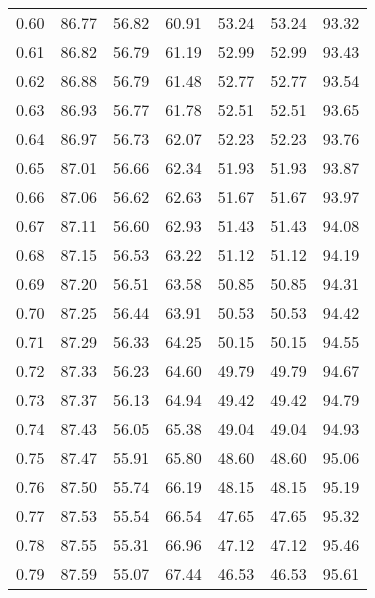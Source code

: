 \begin{tabular}{|c|c|c|c|c|c|c|}
      0.60 &     86.77 &     56.82 &      60.91 &   53.24 &      53.24 &         93.32 \\
      0.61 &     86.82 &     56.79 &      61.19 &   52.99 &      52.99 &         93.43 \\
      0.62 &     86.88 &     56.79 &      61.48 &   52.77 &      52.77 &         93.54 \\
      0.63 &     86.93 &     56.77 &      61.78 &   52.51 &      52.51 &         93.65 \\
      0.64 &     86.97 &     56.73 &      62.07 &   52.23 &      52.23 &         93.76 \\
      0.65 &     87.01 &     56.66 &      62.34 &   51.93 &      51.93 &         93.87 \\
      0.66 &     87.06 &     56.62 &      62.63 &   51.67 &      51.67 &         93.97 \\
      0.67 &     87.11 &     56.60 &      62.93 &   51.43 &      51.43 &         94.08 \\
      0.68 &     87.15 &     56.53 &      63.22 &   51.12 &      51.12 &         94.19 \\
      0.69 &     87.20 &     56.51 &      63.58 &   50.85 &      50.85 &         94.31 \\
      0.70 &     87.25 &     56.44 &      63.91 &   50.53 &      50.53 &         94.42 \\
      0.71 &     87.29 &     56.33 &      64.25 &   50.15 &      50.15 &         94.55 \\
      0.72 &     87.33 &     56.23 &      64.60 &   49.79 &      49.79 &         94.67 \\
      0.73 &     87.37 &     56.13 &      64.94 &   49.42 &      49.42 &         94.79 \\
      0.74 &     87.43 &     56.05 &      65.38 &   49.04 &      49.04 &         94.93 \\
      0.75 &     87.47 &     55.91 &      65.80 &   48.60 &      48.60 &         95.06 \\
      0.76 &     87.50 &     55.74 &      66.19 &   48.15 &      48.15 &         95.19 \\
      0.77 &     87.53 &     55.54 &      66.54 &   47.65 &      47.65 &         95.32 \\
      0.78 &     87.55 &     55.31 &      66.96 &   47.12 &      47.12 &         95.46 \\
      0.79 &     87.59 &     55.07 &      67.44 &   46.53 &      46.53 &         95.61 \\

\end{tabular}
